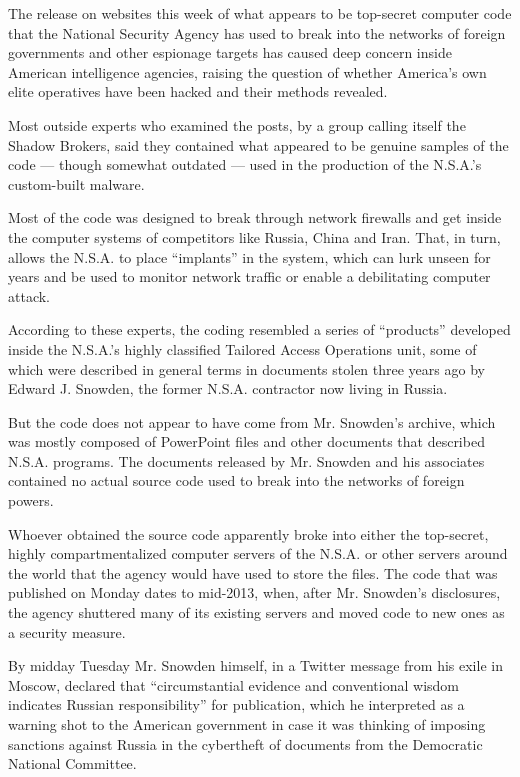 The release on websites this week of what appears to be top-secret
computer code that the National Security Agency has used to break into
the networks of foreign governments and other espionage targets has
caused deep concern inside American intelligence agencies, raising the
question of whether America's own elite operatives have been hacked and
their methods revealed.

Most outside experts who examined the posts, by a group calling itself
the Shadow Brokers, said they contained what appeared to be genuine
samples of the code --- though somewhat outdated --- used in the
production of the N.S.A.'s custom-built malware.

Most of the code was designed to break through network firewalls and get
inside the computer systems of competitors like Russia, China and Iran.
That, in turn, allows the N.S.A. to place ``implants'' in the system,
which can lurk unseen for years and be used to monitor network traffic
or enable a debilitating computer attack.

According to these experts, the coding resembled a series of
``products'' developed inside the N.S.A.'s highly classified Tailored
Access Operations unit, some of which were described in general terms in
documents stolen three years ago by Edward J. Snowden, the former N.S.A.
contractor now living in Russia.

But the code does not appear to have come from Mr. Snowden's archive,
which was mostly composed of PowerPoint files and other documents that
described N.S.A. programs. The documents released by Mr. Snowden and his
associates contained no actual source code used to break into the
networks of foreign powers.

Whoever obtained the source code apparently broke into either the
top-secret, highly compartmentalized computer servers of the N.S.A. or
other servers around the world that the agency would have used to store
the files. The code that was published on Monday dates to mid-2013,
when, after Mr. Snowden's disclosures, the agency shuttered many of its
existing servers and moved code to new ones as a security measure.

By midday Tuesday Mr. Snowden himself, in a Twitter message from his
exile in Moscow, declared that ``circumstantial evidence and
conventional wisdom indicates Russian responsibility'' for publication,
which he interpreted as a warning shot to the American government in
case it was thinking of imposing sanctions against Russia in the
cybertheft of documents from the Democratic National Committee.


